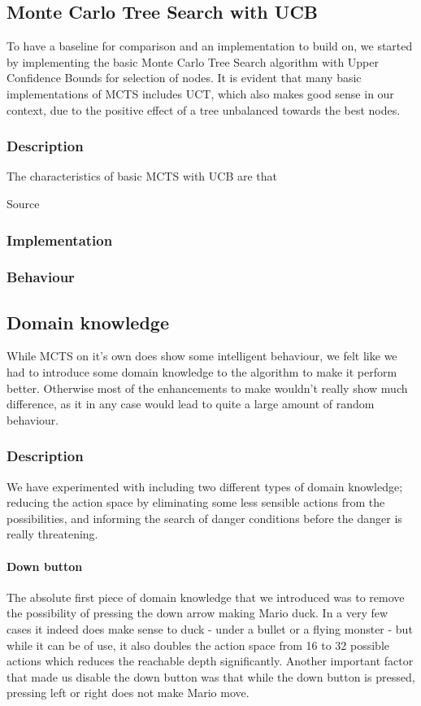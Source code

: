 \documentclass[10pt,a4paper]{article}
\begin{document}
\subsection{Monte Carlo Tree Search with UCB}
To have a baseline for comparison and an implementation to build on, we started by implementing the basic Monte Carlo Tree Search algorithm with Upper Confidence Bounds for selection of nodes. It is evident that many basic implementations of MCTS includes UCT\cite{mspacman}, which also makes good sense in our context, due to the positive effect of a tree unbalanced towards the best nodes.

\subsubsection{Description}
The characteristics of basic MCTS with UCB are that 

Source \cite{mctssurvey}

\subsubsection{Implementation}

\subsubsection{Behaviour}

\subsection{Domain knowledge}
While MCTS on it's own does show some intelligent behaviour, we felt like we had to introduce some domain knowledge to the algorithm to make it perform better. Otherwise most of the enhancements to make wouldn't really show much difference, as it in any case would lead to quite a large amount of random behaviour.

\subsubsection{Description}
We have experimented with including two different types of domain knowledge; reducing the action space by eliminating some less sensible actions from the possibilities, and informing the search of danger conditions before the danger is really threatening.

\paragraph{Down button} %
The absolute first piece of domain knowledge that we introduced was to remove the possibility of pressing the down arrow making Mario duck. In a very few cases it indeed does make sense to duck - under a bullet or a flying monster - but while it can be of use, it also doubles the action space from 16 to 32 possible actions which reduces the reachable depth significantly.
Another important factor that made us disable the down button was that while the down button is pressed, pressing left or right does not make Mario move.
\end{document}
